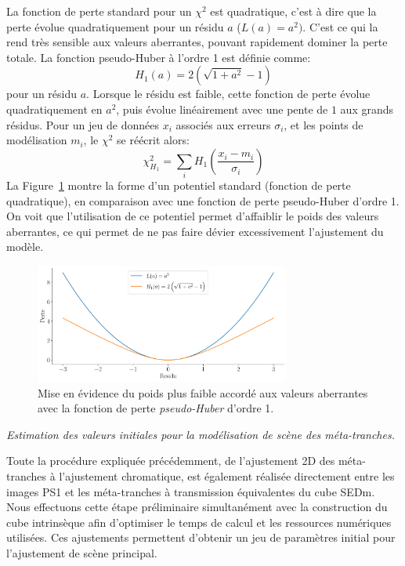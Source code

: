\documentclass[../main/main.tex]{subfiles}
\begin{document}
La fonction de perte standard pour un $\chi^{2}$ est quadratique, c'est
à dire que la perte évolue quadratiquement pour un résidu $a$
($L(a)=a^{2})$. C'est  ce qui la rend très sensible aux valeurs
aberrantes, pouvant rapidement dominer la perte totale.
La fonction pseudo-Huber à l'ordre 1 est définie comme:
\begin{equation}
  \label{eq:Hubber}
  H_{1}(a)=2\left(\sqrt{1+a^{2}}-1\right)
\end{equation}
pour un résidu $a$. Lorsque le résidu est faible, cette fonction de
perte évolue quadratiquement en $a^{2}$, puis évolue linéairement avec
une pente de $1$ aux grands résidus.
Pour un jeu de données $x_{i}$ associés aux erreurs $\sigma_{i}$, et les
points de modélisation $m_{i}$, le $\chi^{2}$ se réécrit alors:
\begin{equation}
  \label{eq:chi2hubber}
  \chi^{2}_{H_{1}}=\sum_{i}H_{1}\left(\frac{x_{i}-m_{i}}{\sigma_{i}}\right)
\end{equation}
La Figure~\ref{fig:softl1} montre la
forme d'un potentiel standard (fonction de perte quadratique), en
comparaison avec une fonction de perte pseudo-Huber d'ordre 1. On voit que
l'utilisation de ce potentiel permet d'affaiblir le poids des valeurs
aberrantes, ce qui permet de ne pas faire dévier excessivement
l'ajustement du modèle.

\begin{figure}[ht]
  \centering
  \includegraphics[width=0.75\textwidth]{../figures/07_scene/softl1.pdf}
  \caption[Fonction de perte \textit{pseudo-Huber}]{Mise en évidence du
    poids plus faible accordé aux valeurs aberrantes avec la fonction de
    perte \textit{pseudo-Huber} d'ordre 1.}
  \label{fig:softl1}
\end{figure}

\begin{frshaded*}
  \footnotesize  
  \centerline{\emph{Estimation des valeurs initiales pour la modélisation
      de scène des méta-tranches.}}  
  Toute la procédure expliquée précédemment, de l'ajustement 2D des
  méta-tranches à l'ajustement chromatique, est également réalisée directement entre les images PS1 et les
  méta-tranches à transmission équivalentes du cube SEDm. Nous
  effectuons cette étape préliminaire simultanément
  avec la construction du cube intrinsèque afin d'optimiser le temps de
  calcul et les ressources numériques utilisées.
  Ces ajustements permettent d'obtenir un
  jeu de paramètres initial pour l'ajustement de scène principal.
\end{frshaded*}
\end{document}
